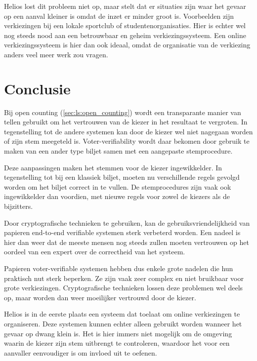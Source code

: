 \npar Helios lost dit probleem niet op, maar stelt dat er situaties zijn waar het gevaar op een aanval kleiner is omdat de inzet er minder groot is. Voorbeelden zijn verkiezingen bij een lokale sportclub of studentenorganisaties. Hier is echter wel nog steeds nood aan een betrouwbaar en geheim verkiezingssysteem. Een online verkiezingssysteem is hier dan ook ideaal, omdat de organisatie van de verkiezing anders veel meer werk zou vragen.

\section{Conclusie}
\label{sec:ls:conclusie}

Bij open counting (\ref{sec:ls:open_counting}) wordt een transparante manier van tellen gebruikt om het vertrouwen van de kiezer in het resultaat te vergroten. In tegenstelling tot de andere systemen kan door de kiezer wel niet nagegaan worden of zijn stem meegeteld is. Voter-verifiability wordt daar bekomen door gebruik te maken van een ander type biljet samen met een aangepaste stemprocedure.

\npar Deze aanpassingen maken het stemmen voor de kiezer ingewikkelder. In tegenstelling tot bij een klassiek biljet, moeten nu verschillende regels gevolgd worden om het biljet correct in te vullen. De stemprocedures zijn vaak ook ingewikkelder dan voordien, met nieuwe regels voor zowel de kiezers als de bijzitters.

\npar Door cryptografische technieken te gebruiken, kan de gebruiksvriendelijkheid van papieren end-to-end verifiable systemen sterk verbeterd worden. Een nadeel is hier dan weer dat de meeste mensen nog steeds zullen moeten vertrouwen op het oordeel van een expert over de correctheid van het systeem.

\npar Papieren voter-verifiable systemen hebben dus enkele grote nadelen die hun praktisch nut sterk beperken. Ze zijn vaak zeer complex en niet bruikbaar voor grote verkiezingen. Cryptografische technieken lossen deze problemen wel deels op, maar worden dan weer moeilijker vertrouwd door de kiezer.

\npar Helios is in de eerste plaats een systeem dat toelaat om online verkiezingen te organiseren. Deze systemen kunnen echter alleen gebruikt worden wanneer het gevaar op dwang klein is. Het is hier immers niet mogelijk om de omgeving waarin de kiezer zijn stem uitbrengt te controleren, waardoor het voor een aanvaller eenvoudiger is om invloed uit te oefenen.